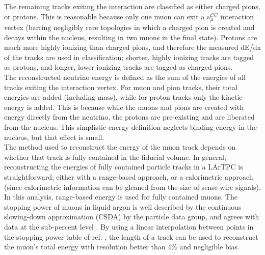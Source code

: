 The remaining tracks exiting the interaction are classified as either charged pions, or protons. This is reasonable because only one muon can exit a $\nu_\mu^{CC}$ interaction vertex (barring negligibly rare topologies in which a charged pion is created and decays within the nucleus, resulting in two muons in the final state). Protons are much more highly ionizing than charged pions, and therefore the measured dE/dx of the tracks are used in classification; shorter, highly ionizing tracks are tagged as protons, and longer, lower ionizing tracks are tagged as charged pions.\\

The reconstructed neutrino energy is defined as the sum of the energies of all tracks exiting the interaction vertex. For muon and pion tracks, their total energies are added (including mass), while for proton tracks only the kinetic energy is added. This is because while the muons and pions are created with energy directly from the neutrino, the protons are pre-existing and are liberated from the nucleus. This simplistic energy definition neglects binding energy in the nucleus, but that effect is small.\\

The method used to reconstruct the energy of the muon track depends on whether that track is fully contained in the fiducial volume. In general, reconstructing the energies of fully contained particle tracks in a LArTPC is straightforward, either with a range-based approach, or a calorimetric approach (since calorimetric information can be gleaned from the size of sense-wire signals). In this analysis, range-based energy is used for fully contained muons. The stopping power of muons in liquid argon is well described by the continuous slowing-down approximation (CSDA) by the particle data group, and agrees with data at the sub-percent level \cite{MIPenergysource} \cite{PDG_spline_table}. By using a linear interpolation between points in the stopping power table of ref. \cite{PDG_spline_table}, the length of a track can be used to reconstruct the muon's total energy with resolution better than 4\% and negligible bias.\\

